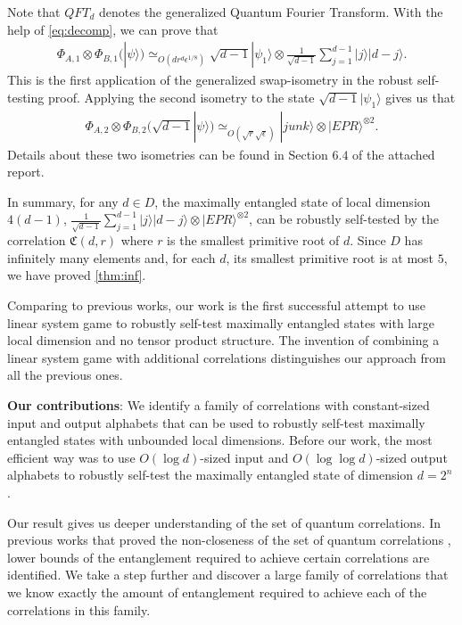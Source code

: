 \documentclass[11pt,letterpaper]{article}
\newcommand{\ket}[1]{|#1\rangle}
\newcommand{\x}{\otimes}
\newcommand{\1}{\mathbb{1}}
\newcommand{\fC}{\mathfrak{C}}
\newcommand{\I}{\mathcal{I}}
\newcommand{\ep}{\epsilon}
\newcommand{\se}{\sqrt{\epsilon}}
\newcommand{\sr}{\sqrt{r}}
\newcommand{\appd}[1]{\simeq_{#1}}
\theoremstyle{definition}
\begin{document}
Note that $QFT_d$ denotes the generalized Quantum Fourier Transform.
With the help of \cref{eq:decomp}, we can prove that
\begin{align*}
    \Phi_{A,1}\x\Phi_{B,1}(\ket{\psi}) \appd{O(d r^{d} \ep^{1/8})} \sqrt{d-1}\ket{\psi_1} \x \frac{1}{\sqrt{d-1}}\sum_{j=1}^{d-1} \ket{j}\ket{d-j}.
\end{align*}
This is the first application of the generalized swap-isometry \cite{yang2013} in the robust self-testing proof.
Applying the second isometry to the state $\sqrt{d-1}\ket{\psi_1}$ gives us that
\begin{align*}
    \Phi_{A,2}\x\Phi_{B,2}(\sqrt{d-1}\ket{\psi})
    \appd{O(\sr \se)} \ket{junk} \x 
    \ket{EPR}^{\x 2}.
\end{align*}
Details about these two isometries can be found in
Section $6.4$ of the attached report.

In summary, for any $d \in D$, the maximally entangled state
of local dimension $4(d-1)$, $\frac{1}{\sqrt{d-1}} \sum_{j=1}^{d-1} \ket{j}\ket{d-j} \x \ket{EPR}^{\x 2}$, can be 
robustly self-tested by the correlation $\fC(d,r)$ 
where $r$ is the smallest primitive root of $d$.
Since $D$ has infinitely many elements and, for each $d$, 
its smallest primitive root is at most $5$, 
we have proved \cref{thm:inf}.


Comparing to previous works, 
our work is the first successful attempt to use linear system game to robustly
self-test maximally entangled states with large local dimension and
no tensor product structure.
The invention of combining a linear system game with 
additional correlations
distinguishes our approach from all the previous ones.


\textbf{Our contributions}:
We identify a family of correlations with constant-sized input and output alphabets that can be used to robustly self-test
maximally entangled states with unbounded local dimensions. Before our work, the most efficient way 
was to use $O(\log d)$-sized input and $O(\log \log d)$-sized output alphabets to robustly self-test
the maximally entangled state of dimension $d = 2^n$ \cite{lowdegree}.  


Our result gives us deeper understanding of the set of quantum correlations.
In previous works that proved the non-closeness of the set of quantum correlations \cite{slofstra2017, slofstra2018}, 
lower bounds of the entanglement required to achieve certain correlations are identified.
We take a step further and discover a large family of correlations that we know exactly the amount of entanglement
required to achieve each of the correlations in this family. 




\end{document}
